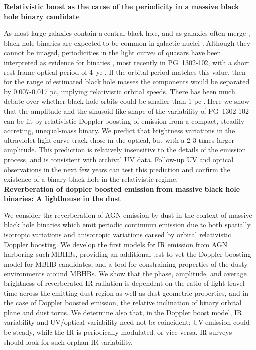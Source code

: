 \documentclass[12pt,letterpaper]{article}
\begin{document}
\noindent
\textbf{Relativistic boost as the cause of the periodicity in a massive
black hole binary candidate} 

As most large galaxies contain a central black hole, and as galaxies   often
merge \cite{KormendyHo2013}, black hole binaries are expected   to be common
in galactic nuclei \cite{Begel:Blan:Rees:1980}.  Although they cannot   be
imaged, periodicities in the light curves of quasars have been interpreted as
evidence for binaries \cite{Komossa:Rev06,Valtonen+2008,Liu:7RsMBHB:2015},
most recently in PG~1302-102, with a short rest-frame optical period of 4~yr
\citep{Graham+2015a}. If the orbital period matches this value,   then for the
range of estimated black hole masses the components   would be separated by
0.007-0.017 pc, implying relativistic orbital   speeds. There has been much
debate over whether black hole orbits   could be smaller than 1 pc
\cite{Milosavljevic:2003:FPcP}. Here we show that the   amplitude and the
sinusoid-like shape of the variability of PG~1302-102 can be fit by
relativistic Doppler boosting of emission   from a compact, steadily
accreting, unequal-mass binary.  We predict   that brightness variations in
the ultraviolet light curve track those in the optical, but with a 2-3 times
larger amplitude. This   prediction is relatively insensitive to the details
of the emission   process, and is consistent with archival UV data.  Follow-up
UV and   optical observations in the next few years can test this prediction
and confirm the existence of a binary black hole in the relativistic   regime.\\


\noindent
\textbf{Reverberation of doppler boosted emission from massive black hole
binaries: A lighthouse in the dust} 

We consider the reverberation of AGN emission by dust in the context of
massive black hole binaries which emit periodic continuum emission due to both
spatially isotropic variations and anisotropic variations caused by orbital
relativistic Doppler boosting. We develop the first models for IR emission
from AGN harboring such MBHBs, providing an additional test to vet the Doppler
boosting model for MBHB candidates, and a tool for constraining properties of
the dusty environments around MBHBs. We show that the phase, amplitude, and
average brightness of reverberated IR radiation is dependent on the ratio of
light travel time across the emitting dust region as well as dust geometric
properties, and in the case of Doppler boosted emission, the relative
inclination of binary orbital plane and dust torus. We determine also that, in
the Doppler boost model, IR variability and UV/optical variability need not be
coincident; UV emission could be steady, while the IR is periodically
modulated, or vice versa. IR surveys should look for such orphan IR
variability.
\end{document}
